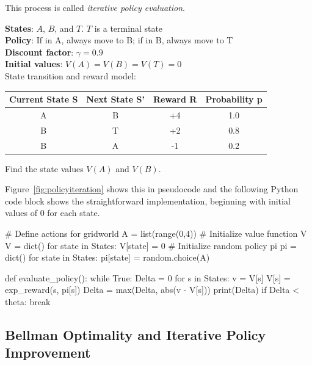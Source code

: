 This process is called \emph{iterative policy evaluation}.

\begin{exerciseboxpaper}
{\bf States}: $A$, $B$, and $T$. $T$ is a terminal state \\
{\bf Policy}: If in A, always move to B; if in B, always move to T \\
{\bf Discount factor}: $\gamma = 0.9$ \\
{\bf Initial values}: $V(A) = V(B) = V(T) = 0$ \\

State transition and reward model:

\vspace{0.5\baselineskip}

\renewcommand{\arraystretch}{1.25}
\begin{tabular}{c|c|c|c}
{\bf Current State S} & {\bf Next State S'} & {\bf Reward R} & {\bf Probability p} \\ \hline
A & B & +4 & 1.0 \\
B & T & +2 & 0.8 \\
B & A & -1 & 0.2 \\ 
\end{tabular}

\vspace{0.5\baselineskip}

Find the state values $V(A)$ and $V(B)$.
\end{exerciseboxpaper}

\begin{withcode}
Figure~\ref{fig:policyiteration} shows this in pseudocode and the following Python code block shows the straightforward implementation, beginning with initial values of $0$ for each state.

\begin{pythoncode}
# Define actions for gridworld
A = list(range(0,4))
# Initialize value function V
V = dict()
for state in States:
    V[state] = 0
# Initialize random policy pi
pi = dict()
for state in States:
    pi[state] = random.choice(A)

def evaluate_policy():
    while True:
        Delta = 0
        for s in States:
            v = V[s]
            V[s] = exp_reward(s, pi[s])
            Delta = max(Delta, abs(v - V[s]))
        print(Delta)
        if Delta < theta:
            break
\end{pythoncode}
\end{withcode}

\subsection{Bellman Optimality and Iterative Policy Improvement}

